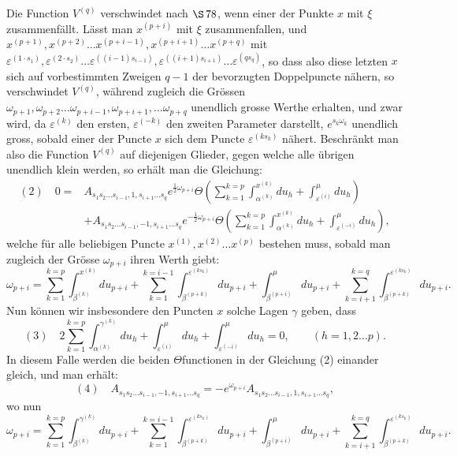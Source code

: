 \documentclass[10pt]{article}
\begin{document}
Die Function \(V^{(q)}\) verschwindet nach \(\S\,78\), wenn einer der Punkte \(x\) mit \(\xi\) zusammenfällt. Lässt man \(x^{(p+i)}\) mit \(\xi\) zusammenfallen, und \(x^{(p+1)},x^{(p+2)}\ldots x^{(p+i-1)},x^{(p+i+1)}\ldots x^{(p+q)}\) mit \(\varepsilon^{(1\cdot s_1)},\varepsilon^{(2\cdot s_2)}\ldots\varepsilon^{((i-1)s_{i-1})},\varepsilon^{((i+1)s_{i+1})}\ldots\varepsilon^{(qs_q)}\), so dass also diese letzten \(x\) sich auf vorbestimmten Zweigen \(q-1\) der bevorzugten Doppelpuncte nähern, so verschwindet \(V^{(q)}\), während zugleich die Grössen \(\omega_{p+1},\omega_{p+2}\ldots\omega_{p+i-1},\omega_{p+i+1},\ldots\omega_{p+q}\) unendlich grosse Werthe erhalten, und zwar wird, da \(\varepsilon^{(k)}\) den ersten, \(\varepsilon^{(-k)}\) den zweiten Parameter darstellt, \(e^{s_k\omega_k}\) unendlich gross, sobald einer der Puncte \(x\) sich dem Puncte \(\varepsilon^{(ks_k)}\) nähert. Beschränkt man also die Function \(V^{(q)}\) auf diejenigen Glieder, gegen welche alle übrigen unendlich klein werden, so erhält man die Gleichung:
\[
\begin{aligned}
(2)\quad 0={}&A_{s_1s_2\ldots s_{i-1},1,s_{i+1}\ldots s_q}
 e^{\frac12\omega_{p+i}}
 \Theta\left(\sum_{k=1}^{k=p}\int_{\alpha^{(k)}}^{x^{(k)}}du_h+
 \int_{\varepsilon^{(i)}}^{\mu}du_h\right)\\
&+A_{s_1s_2\ldots s_{i-1},-1,s_{i+1}\ldots s_q}
 e^{-\frac12\omega_{p+i}}
 \Theta\left(\sum_{k=1}^{k=p}\int_{\alpha^{(k)}}^{x^{(k)}}du_h+
 \int_{\varepsilon^{(-i)}}^{\mu}du_h\right),
\end{aligned}
\]
welche für alle beliebigen Puncte \(x^{(1)},x^{(2)}\ldots x^{(p)}\) bestehen muss, sobald man zugleich der Grösse \(\omega_{p+i}\) ihren Werth giebt:
\[
\omega_{p+i}=\sum_{k=1}^{k=p}\int_{\beta^{(k)}}^{x^{(k)}}du_{p+i}
+\sum_{k=1}^{k=i-1}\int_{\beta^{(p+k)}}^{\varepsilon^{(ks_k)}}du_{p+i}
+\int_{\beta^{(p+i)}}^{\mu}du_{p+i}
+\sum_{k=i+1}^{k=q}\int_{\beta^{(p+k)}}^{\varepsilon^{(ks_k)}}du_{p+i}.
\]
Nun können wir insbesondere den Puncten \(x\) solche Lagen \(\gamma\) geben, dass
\[
(3)\quad
2\sum_{k=1}^{k=p}\int_{\alpha^{(k)}}^{\gamma^{(k)}}du_h+
\int_{\varepsilon^{(i)}}^{\mu}du_h+
\int_{\varepsilon^{(-i)}}^{\mu}du_h=0,
\qquad (h=1,2\ldots p).
\]
In diesem Falle werden die beiden \(\Theta\)functionen in der Gleichung (2) einander gleich, und man erhält:
\[
(4)\quad
A_{s_1s_2\ldots s_{i-1},-1,s_{i+1}\ldots s_q}
=-e^{\omega_{p+i}}A_{s_1s_2\ldots s_{i-1},1,s_{i+1}\ldots s_q},
\]
wo nun
\[
\omega_{p+i}=\sum_{k=1}^{k=p}\int_{\beta^{(k)}}^{\gamma^{(k)}}du_{p+i}
+\sum_{k=1}^{k=i-1}\int_{\beta^{(p+k)}}^{\varepsilon^{(ks_k)}}du_{p+i}
+\int_{\beta^{(p+i)}}^{\mu}du_{p+i}
+\sum_{k=i+1}^{k=q}\int_{\beta^{(p+k)}}^{\varepsilon^{(ks_k)}}du_{p+i}.
\tag{5}
\]
\end{document}
